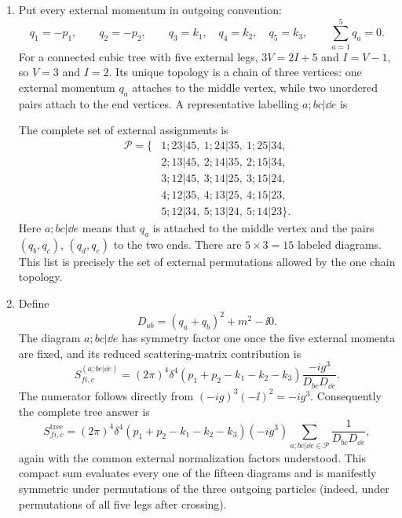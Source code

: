 \begin{enumerate}
\begin{enumerate}
\item
Put every external momentum in outgoing convention:
\[
 q_1=-p_1,\qquad q_2=-p_2,\qquad
 q_3=k_1,\quad q_4=k_2,\quad q_5=k_3,
 \qquad \sum_{a=1}^{5}q_a=0.
\]
For a connected cubic tree with five external legs,
\(3V=2I+5\) and \(I=V-1\), so \(V=3\) and \(I=2\).  Its unique topology is
a chain of three vertices: one external momentum \(q_a\) attaches to the
middle vertex, while two unordered pairs attach to the end vertices.  A
representative labelling \(a;bc|\dd e\) is
\begin{center}
\end{center}
The complete set of external assignments is
\[
 \begin{split}
 \mathcal P=\{&1;23|45,\ 1;24|35,\ 1;25|34,\\
               &2;13|45,\ 2;14|35,\ 2;15|34,\\
               &3;12|45,\ 3;14|25,\ 3;15|24,\\
               &4;12|35,\ 4;13|25,\ 4;15|23,\\
               &5;12|34,\ 5;13|24,\ 5;14|23\}.
 \end{split}
\]
Here \(a;bc|\dd e\) means that \(q_a\) is attached to the middle vertex and
the pairs \((q_b,q_c)\), \((q_d,q_e)\) to the two ends.  There are
\(5\times3=15\) labeled diagrams.  This list is precisely the set of
external permutations allowed by the one chain topology.

\item
Define
\[
 D_{ab}=(q_a+q_b)^2+m^2-\ii0.
\]
The diagram \(a;bc|\dd e\) has symmetry factor one once the five external
momenta are fixed, and its reduced scattering-matrix contribution is
\[
 S^{(a;bc|\dd e)}_{fi,c}
 =(2\pi)^4\delta^4(p_1+p_2-k_1-k_2-k_3)
 \frac{-ig^3}{D_{bc}D_{\dd e}}.
\]
The numerator follows directly from
\((-ig)^3(-\ii)^2=-ig^3\).  Consequently the complete tree answer is
\[
 S^{\mathrm{tree}}_{fi,c}
 =(2\pi)^4\delta^4(p_1+p_2-k_1-k_2-k_3)
 (-ig^3)\sum_{a;bc|\dd e\in\mathcal P}\frac1{D_{bc}D_{\dd e}},
\]
again with the common external normalization factors understood.  This
compact sum evaluates every one of the fifteen diagrams and is manifestly
symmetric under permutations of the three outgoing particles (indeed, under
permutations of all five legs after crossing).
\end{enumerate}


\end{enumerate}
